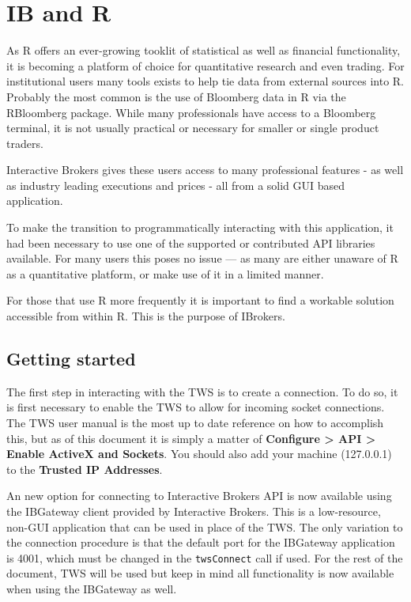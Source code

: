 \documentclass{article}
\begin{document}
\section{IB and R}
As R offers an ever-growing tooklit of statistical as well
as financial functionality, it is becoming a platform
of choice for quantitative research and even trading. For
institutional users many tools exists to help
tie data from external sources into R. Probably the most
common is the use of Bloomberg data in R via the
RBloomberg package.  While many professionals have
access to a Bloomberg terminal, it is not usually practical
or necessary for smaller or single product traders.

Interactive Brokers gives these users access to many
professional features - as well as industry leading
executions and prices - all from a solid GUI
based application.

To make the transition to programmatically interacting
with this application, it had been necessary to use
one of the supported or contributed API libraries
available. For many users this poses no issue --- as many
are either unaware of R as a quantitative platform, or
make use of it in a limited manner.

For those that use R more frequently it is important
to find a workable solution accessible from within
R.  This is the purpose of IBrokers.

\subsection{Getting started}
The first step in interacting with the TWS is to
create a connection.  To do so, it is first
necessary to enable the TWS to allow for
incoming socket connections. The TWS
user manual is the most up to date reference on
how to accomplish this, but as of this document
it is simply a matter of \textbf{Configure > API > Enable ActiveX and Sockets}.
You should also add your machine (127.0.0.1) to the \textbf{Trusted IP Addresses}.

An new option for connecting to Interactive Brokers API is
now available using the IBGateway client provided by Interactive Brokers. This
is a low-resource, non-GUI application that can be used in place of the
TWS.  The only variation to the connection procedure is that the default
port for the IBGateway application is 4001, which must be changed in
the {\tt twsConnect} call if used. For the rest of the document, TWS will
be used but keep in mind all functionality is now available when
using the IBGateway as well.
\end{document}
